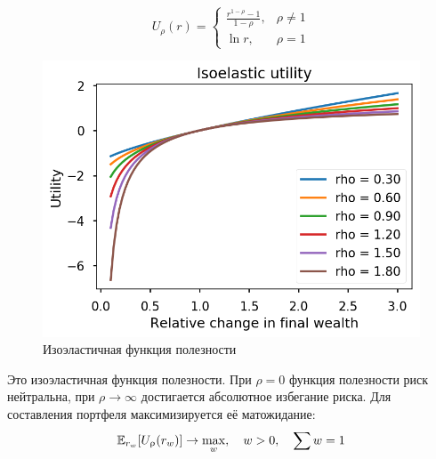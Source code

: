 \begin{minipage}{0.4\linewidth}
\begin{equation}
U_\rho(r) = \begin{cases}
\frac{r^{1-\rho}-1}{1-\rho}, &\rho\ne 1\\
\ln r, &\rho = 1
\end{cases}
\end{equation}
\end{minipage}
\begin{minipage}{0.5\linewidth}
	\begin{figure}[H]
		\centering
		\includegraphics[width=0.7\linewidth]{Thesis/images/isoelastic}
		\caption{Изоэластичная функция полезности}
		\label{fig:isoelastic}	
	\end{figure}
\end{minipage}
\vspace{.5cm}

Это изоэластичная функция полезности. При $\rho=0$ функция полезности риск нейтральна, при $\rho \to \infty$ достигается абсолютное избегание риска. Для составления портфеля максимизируется её  матожидание:
\begin{equation}
\Eb[r_w]{U_\rho(r_w)} \to \max_w, \quad w>0,\quad \sum w = 1
\label{eq:isoelastic}
\end{equation}
